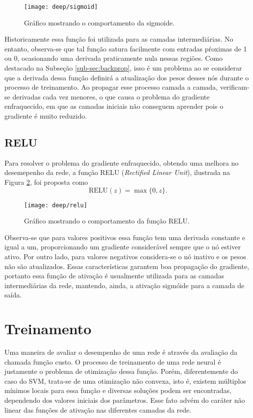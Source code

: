 \begin{figure}
\centering
\texttt{[image: deep/sigmoid]}
\caption{Gráfico mostrando o comportamento da sigmoide.}
\label{fig:sigmoid}
\end{figure}

Historicamente essa função foi utilizada para as camadas intermediárias. No entanto, observa-se que tal função satura facilmente com entradas pŕoximas de 1 ou 0, ocasionando uma derivada praticamente nula nessas regiões. Como destacado na Subseção \ref{sub-sec:backprop}, isso é um problema ao se considerar que a derivada dessa função definirá a atualização dos pesos desses nós durante o processo de treinamento. Ao propagar esse processo camada a camada, verificam-se derivadas cada vez menores, o que causa o problema do gradiente enfraquecido, em que as camadas iniciais não conseguem aprender pois o gradiente é muito reduzido.

\subsection{RELU}
Para resolver o problema do gradiente enfraquecido, obtendo uma melhora no desemepenho da rede, a função RELU (\textit{Rectified Linear Unit}), ilustrada na Figura \ref{fig:relu}, foi proposta \cite{nair2010relu} como
\begin{equation}
	\label{eq:relu}
	\text{RELU}(z) = \max\{0,z\}.
\end{equation}

\begin{figure}
\centering
\texttt{[image: deep/relu]}
\caption{Gráfico mostrando o comportamento da função RELU.}
\label{fig:relu}
\end{figure}

Observa-se que para valores positivos essa função tem uma derivada constante e igual a um, proporcionando um gradiente considerável sempre que o nó estiver ativo. Por outro lado, para valores negativos considera-se o nó inativo e os pesos não são atualizados. Essas características garantem boa propagação do gradiente, portanto essa função de ativação é usualmente utilizada para as camadas intermediárias da rede, mantendo, ainda, a ativação sigmóide para a camada de saída.

\section{Treinamento}
Uma maneira de avaliar o desempenho de uma rede é através da avaliação da chamada função custo. O processo de treinamento de uma rede neural é justamente o problema de otimização dessa função. Porém, diferentemente do caso do SVM, trata-se de uma otimização não convexa, isto é, existem múltiplos mínimos locais para essa função e diversas soluções podem ser encontradas, dependendo dos valores iniciais dos parâmetros. Esse fato advém do caráter não linear das funções de ativação nas diferentes camadas da rede.

